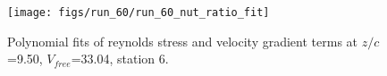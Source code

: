 \begin{figure}[H]
\centering
\texttt{[image: figs/run\_60/run\_60\_nut\_ratio\_fit]}
\caption{Polynomial fits of reynolds stress and velocity gradient terms at $z/c$=9.50, $V_{free}$=33.04, station 6.}
\label{fig:run_60_nut_ratio_fit}
\end{figure}


